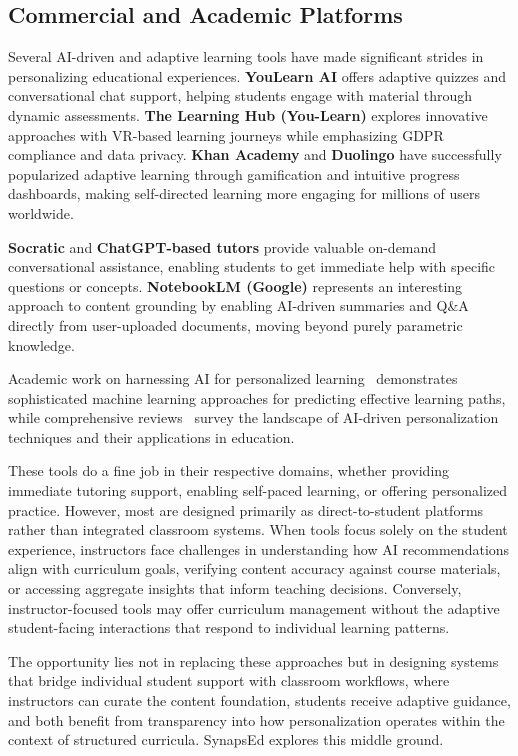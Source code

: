 \documentclass{stylefiles/capstone}
\begin{document}
\subsection{Commercial and Academic Platforms}

Several AI-driven and adaptive learning tools have made significant strides in personalizing educational experiences. \textbf{YouLearn AI} offers adaptive quizzes and conversational chat support, helping students engage with material through dynamic assessments. \textbf{The Learning Hub (You-Learn)} explores innovative approaches with VR-based learning journeys while emphasizing GDPR compliance and data privacy. \textbf{Khan Academy} and \textbf{Duolingo} have successfully popularized adaptive learning through gamification and intuitive progress dashboards, making self-directed learning more engaging for millions of users worldwide.

\textbf{Socratic} and \textbf{ChatGPT-based tutors} provide valuable on-demand conversational assistance, enabling students to get immediate help with specific questions or concepts. \textbf{NotebookLM (Google)} represents an interesting approach to content grounding by enabling AI-driven summaries and Q\&A directly from user-uploaded documents, moving beyond purely parametric knowledge.

Academic work on harnessing AI for personalized learning~\cite{Li} demonstrates sophisticated machine learning approaches for predicting effective learning paths, while comprehensive reviews~\cite{NaseerFawad2024Idlt} survey the landscape of AI-driven personalization techniques and their applications in education.

These tools do a fine job in their respective domains, whether providing immediate tutoring support, enabling self-paced learning, or offering personalized practice. However, most are designed primarily as direct-to-student platforms rather than integrated classroom systems. When tools focus solely on the student experience, instructors face challenges in understanding how AI recommendations align with curriculum goals, verifying content accuracy against course materials, or accessing aggregate insights that inform teaching decisions. Conversely, instructor-focused tools may offer curriculum management without the adaptive student-facing interactions that respond to individual learning patterns.

The opportunity lies not in replacing these approaches but in designing systems that bridge individual student support with classroom workflows, where instructors can curate the content foundation, students receive adaptive guidance, and both benefit from transparency into how personalization operates within the context of structured curricula. SynapsEd explores this middle ground.
\end{document}
